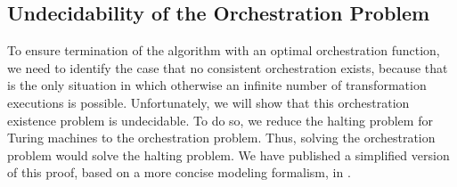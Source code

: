 



\subsection{Undecidability of the Orchestration Problem} %

To ensure termination of the  algorithm with an optimal orchestration function, we need to identify the case that no consistent orchestration exists, because that is the only situation in which otherwise an infinite number of transformation executions is possible.
Unfortunately, we will show that this orchestration existence problem is undecidable.
To do so, we reduce the halting problem for Turing machines to the orchestration problem.
Thus, solving the orchestration problem would solve the halting problem.
We have published a simplified version of this proof, based on a more concise modeling formalism, in \cite{gleitze2020orchestration}.

